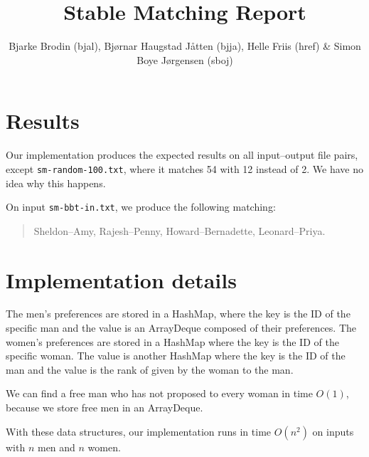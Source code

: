 \documentclass{tufte-handout}
\title{Stable Matching Report}
\author{Bjarke Brodin (bjal), Bjørnar Haugstad Jåtten (bjja), Helle Friis (href) & Simon Boye Jørgensen (sboj)}
\begin{document}
  \maketitle

  \section{Results}

  Our implementation produces the expected results on all input--output file pairs, except {\tt sm-random-100.txt}, where it matches 54 with 12 instead of 2.
  We have no idea why this happens.%

  On input {\tt sm-bbt-in.txt}, we produce the following matching:
  \begin{quotation}
    Sheldon--Amy, Rajesh--Penny, Howard--Bernadette, Leonard--Priya.  
  \end{quotation}

  \section{Implementation details}

  The men's preferences are stored in a HashMap, where the key is the ID of the specific man and the value is an ArrayDeque composed of their preferences.
  The women's preferences are stored in a HashMap where the key is the ID of the specific woman. 
  The value is another HashMap where the key is the ID of the man and the value is the rank of given by the woman to the man.

  We can find a free man who has not proposed to every woman in time $O(1)$,
  because we store free men in an ArrayDeque.

  With these data structures, our implementation runs in time $O(n^2)$ on inputs with $n$ men and $n$ women.
\end{document}
